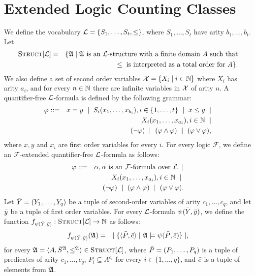 \section{Extended Logic Counting Classes}

We define the vocabulary $\L = \{ S_1,\dots,S_t, \leq \}$, where $S_1,\dots,S_t$ have arity $b_1,\dots,b_t$. Let
\begin{eqnarray*}
	\Truc &=& \{\A \mid \A \text{ is an } \L \text{-structure with a finite domain } A \text{ such that} \\
	&& \leq \text{ is interpreted as a total order for } A \}.
\end{eqnarray*}
We also define a set of second order variables ${\cal X} = \{ X_i \mid i\in\N \}$ where $X_i$ has arity $a_i$, and for every $n \in \N$ there are infinite variables in ${\cal X}$ of arity $n$. A quantifier-free $\L$-formula is defined by the following grammar:
\begin{eqnarray*}
	\varphi &::=& x = y \ \mid \ S_i(x_1,\dots,x_{b_i}), i \in \{1,\dots,t\} \ \mid \ x \leq y \ \mid \\
	&& X_i(x_1,\dots,x_{a_i}), i\in\N \ \mid \\ 
	&& (\neg \varphi) \ \mid \ (\varphi \wedge \varphi) \ \mid \ (\varphi \vee \varphi),
\end{eqnarray*}
where $x,y$ and $x_i$ are first order variables for every $i$. For every logic $\mathcal{F}$, we define an $\mathcal{F}$-extended quantifier-free $\L$-formula as follows:
\begin{eqnarray*}
	\varphi &::=& \alpha, \alpha \text{ is an $\mathcal{F}$-formula over } \L  \ \mid \\
	&& X_i(x_1,\dots,x_{a_i}), i\in\N \ \mid \ \\
	&& (\neg \varphi) \ \mid \ (\varphi \wedge \varphi) \ \mid \ (\varphi \vee \varphi).
\end{eqnarray*}
Let $\Y = (Y_1,\dots,Y_q)$ be a tuple of second-order variables of arity $c_1,\ldots,c_q$, and let $\y$ be a tuple of first order variables. For every $\L$-formula $\psi(\Y,\y)$, we define the function $f_{\psi(\Y,\y)}:\Truc \to \N$ as follows:
\begin{eqnarray*}
	f_{\psi(\Y,\y)}(\A) &=& \mid \{ \langle \P, \e \rangle \mid \A \models \psi(\P,\e) \} \mid,
\end{eqnarray*}
for every $\A = \langle A, \S^{\A}, \leq^{\A} \rangle \in \Truc$, where $\P = (P_1,\ldots,P_q)$ is a tuple of predicates of arity $c_1,\ldots,c_q$, $P_i \subseteq A^{c_i}$ for every $i \in \{1,\ldots,q\}$, and $\e$ is a tuple of elements from $\A$.\\

